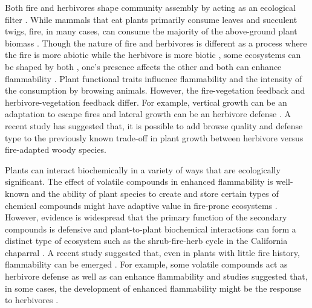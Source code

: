 \documentclass{ttuthes2007}
\begin{document}
Both fire and herbivores shape community assembly by acting as an ecological filter \citep{belsky1992effects, grazingecologicalfilters, morphospace, verdu2007ecologicalfilter,fireecologicalfitlers}. While mammals that eat plants primarily consume leaves and succulent twigs, fire, in many cases, can consume the majority of the above-ground plant biomass \citep{bond1996fire, bond2005fire}. Though the nature of fire and herbivores is different as a process where the fire is more abiotic while the herbivore is more biotic  \citep{bond2005fire,archibald2019unified}, some ecosystems can be shaped by both \citep{van2003effects,  archibald2005shaping,staver2009browsing,donaldson2018ecological, noy1995interactive}, one's presence affects the other\citep{holdo2009grazers, foster2015synergistic} and both can enhance flammability \citep{white1994monoterpenes, owens1998seasonal, pausas2012firesulex}. Plant functional traits influence flammability and the intensity of the consumption by browsing animals. However, the fire-vegetation feedback and herbivore-vegetation feedback differ. For example,  vertical growth can be an adaptation to escape fires and lateral growth can be an herbivore defense \citep{archibald2003growing,staver2012top,moncrieff2011tree}.  %
A recent study \citep{wigley2015mammal} has suggested that, it is possible to add browse quality and defense type to the previously known trade-off in plant growth between herbivore versus fire-adapted woody species.

Plants can interact biochemically in a variety of ways %
that are ecologically significant\citep{muller1966role}. The effect of volatile compounds in enhanced flammability is well-known \citep{mutch1970wildland,white1994monoterpenes,owens1998seasonal,volatile1,volatile2,volatile3,alam2020shoot,ormeno2009relationship} and the ability of plant species to create and store certain types of chemical compounds might have adaptive value in fire-prone ecosystems \citep{pausas2016secondary}. However, evidence is widespread that the primary function of the secondary compounds is defensive \citep{primaryfunction} and plant-to-plant biochemical interactions can form a distinct type of ecosystem such as the shrub-fire-herb cycle in the California chaparral \citep{allelopathic}. A recent study suggested that, even in plants with little fire history, flammability can be emerged \citep{cui2020shoot}. For example, some volatile compounds act as herbivore defense as well as can enhance flammability and studies suggested that, in some cases, the development of enhanced flammability might be the response to herbivores \citep{white1994monoterpenes, owens1998seasonal}  .
\end{document}
